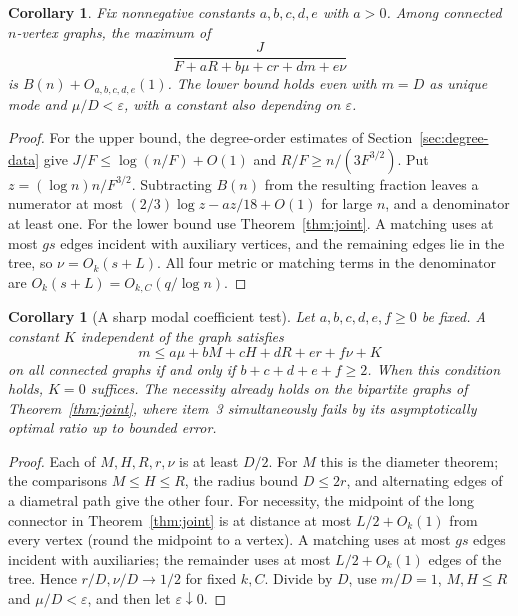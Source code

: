 \documentclass[11pt,a4paper]{article}
\newtheorem{corollary}[theorem]{Corollary}
\theoremstyle{remark}\newtheorem*{remark}{Remark}
\begin{document}
\begin{corollary}
Fix nonnegative constants $a,b,c,d,e$ with $a>0$. Among connected $n$-vertex graphs, the maximum of
\[
 \frac{J}{F+aR+b\mu+cr+dm+e\nu}
\]
is $B(n)+O_{a,b,c,d,e}(1)$. The lower bound holds even with $m=D$ as unique mode and $\mu/D<\varepsilon$, with a constant also depending on $\varepsilon$.
\end{corollary}
\begin{proof}
For the upper bound, the degree-order estimates of Section~\ref{sec:degree-data} give $J/F\le\log(n/F)+O(1)$ and $R/F\ge n/(3F^{3/2})$. Put $z=(\log n)n/F^{3/2}$. Subtracting $B(n)$ from the resulting fraction leaves a numerator at most $(2/3)\log z-a z/18+O(1)$ for large $n$, and a denominator at least one. For the lower bound use Theorem~\ref{thm:joint}. A matching uses at most $gs$ edges incident with auxiliary vertices, and the remaining edges lie in the tree, so $\nu=O_k(s+L)$. All four metric or matching terms in the denominator are $O_k(s+L)=O_{k,C}(q/\log n)$.
\end{proof}
\begin{corollary}[A sharp modal coefficient test]
Let $a,b,c,d,e,f\ge0$ be fixed. A constant $K$ independent of the graph satisfies
\[
 m\le a\mu+bM+cH+dR+er+f\nu+K
\]
on all connected graphs if and only if $b+c+d+e+f\ge2$. When this condition holds, $K=0$ suffices. The necessity already holds on the bipartite graphs of Theorem~\ref{thm:joint}, where item~3 simultaneously fails by its asymptotically optimal ratio up to bounded error.
\end{corollary}
\begin{proof}
Each of $M,H,R,r,\nu$ is at least $D/2$. For $M$ this is the diameter theorem; the comparisons $M\le H\le R$, the radius bound $D\le2r$, and alternating edges of a diametral path give the other four. For necessity, the midpoint of the long connector in Theorem~\ref{thm:joint} is at distance at most $L/2+O_k(1)$ from every vertex (round the midpoint to a vertex). A matching uses at most $gs$ edges incident with auxiliaries; the remainder uses at most $L/2+O_k(1)$ edges of the tree. Hence $r/D,\nu/D\to1/2$ for fixed $k,C$. Divide by $D$, use $m/D=1$, $M,H\le R$ and $\mu/D<\varepsilon$, and then let $\varepsilon\downarrow0$.
\end{proof}
\end{document}
